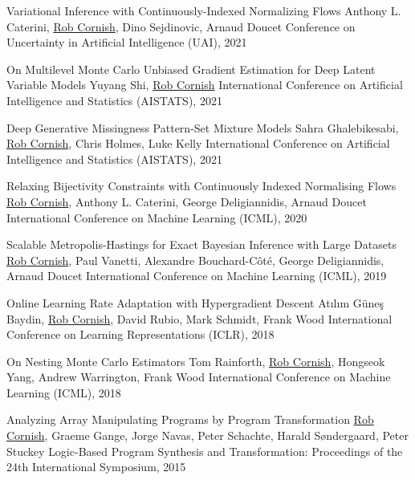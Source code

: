 \documentclass[9pt]{developercv} %
\begin{document}
\begin{entrylist}
    \publication
        {Variational Inference with Continuously-Indexed Normalizing Flows}
        {Anthony L. Caterini, \underline{Rob Cornish}, Dino Sejdinovic, Arnaud Doucet}
        {Conference on Uncertainty in Artificial Intelligence (UAI), 2021}

    \publication
        {On Multilevel Monte Carlo Unbiased Gradient Estimation for Deep Latent Variable Models}
        {Yuyang Shi, \underline{Rob Cornish}}
        {International Conference on Artificial Intelligence and Statistics (AISTATS), 2021}

    \publication
        {Deep Generative Missingness Pattern-Set Mixture Models}
        {Sahra Ghalebikesabi, \underline{Rob Cornish}, Chris Holmes, Luke Kelly}
        {International Conference on Artificial Intelligence and Statistics (AISTATS), 2021}

    \publication
        {Relaxing Bijectivity Constraints with Continuously Indexed Normalising Flows}
        {\underline{Rob Cornish}, Anthony L. Caterini, George Deligiannidis, Arnaud Doucet}
        {International Conference on Machine Learning (ICML), 2020}

    \publication
        {Scalable Metropolis-Hastings for Exact Bayesian Inference with Large Datasets}
        {\underline{Rob Cornish}, Paul Vanetti, Alexandre Bouchard-C\^ot\'e, George Deligiannidis, Arnaud Doucet}
        {International Conference on Machine Learning (ICML), 2019}

    \publication
        {Online Learning Rate Adaptation with Hypergradient Descent}
        {At\i l\i m G\"une\c s Baydin, \underline{Rob Cornish}, David Rubio, Mark Schmidt, Frank Wood}
        {International Conference on Learning Representations (ICLR), 2018}

    \publication
        {On Nesting Monte Carlo Estimators}
        {Tom Rainforth, \underline{Rob Cornish}, Hongseok Yang, Andrew Warrington, Frank Wood}
        {International Conference on Machine Learning (ICML), 2018}

    \publication
        {Analyzing Array Manipulating Programs by Program Transformation}
        {\underline{Rob Cornish}, Graeme Gange, Jorge Navas, Peter Schachte, Harald S\o ndergaard, Peter Stuckey}
        {Logic-Based Program Synthesis and Transformation: Proceedings of the 24th International Symposium, 2015}
\end{entrylist}

\end{document}

